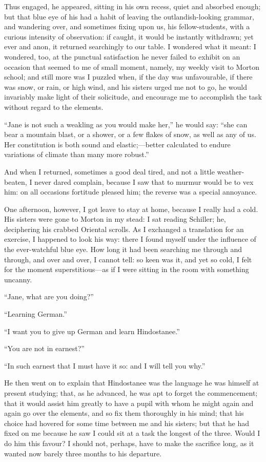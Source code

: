 Thus engaged, he appeared, sitting in his own recess, quiet and absorbed
enough; but that blue eye of his had a habit of leaving the
outlandish-looking grammar, and wandering over, and sometimes fixing
upon us, his fellow-students, with a curious intensity of observation:
if caught, it would be instantly withdrawn; yet ever and anon, it
returned searchingly to our table. I wondered what it meant: I
wondered, too, at the punctual satisfaction he never failed to exhibit
on an occasion that seemed to me of small moment, namely, my weekly
visit to Morton school; and still more was I puzzled when, if the day
was unfavourable, if there was snow, or rain, or high wind, and his
sisters urged me not to go, he would invariably make light of their
solicitude, and encourage me to accomplish the task without regard to
the elements.

\enquote{Jane is not such a weakling as you would make her,} he would
say: \enquote{she can bear a mountain blast, or a shower, or a few
	flakes of snow, as well as any of us. Her constitution is both sound
	and elastic;---better calculated to endure variations of climate than
	many more robust.}

And when I returned, sometimes a good deal tired, and not a little
weather-beaten, I never dared complain, because I saw that to murmur
would be to vex him: on all occasions fortitude pleased him; the reverse
was a special annoyance.

One afternoon, however, I got leave to stay at home, because I really
had a cold. His sisters were gone to Morton in my stead: I sat reading
Schiller; he, deciphering his crabbed Oriental scrolls. As I exchanged
a translation for an exercise, I happened to look his way: there I found
myself under the influence of the ever-watchful blue eye. How long it
had been searching me through and through, and over and over, I cannot
tell: so keen was it, and yet so cold, I felt for the moment
superstitious---as if I were sitting in the room with something uncanny.

\enquote{Jane, what are you doing?}

\enquote{Learning German.}

\enquote{I want you to give up German and learn Hindostanee.}

\enquote{You are not in earnest?}

\enquote{In such earnest that I must have it so: and I will tell you
	why.}

He then went on to explain that Hindostanee was the language he was
himself at present studying; that, as he advanced, he was apt to forget
the commencement; that it would assist him greatly to have a pupil with
whom he might again and again go over the elements, and so fix them
thoroughly in his mind; that his choice had hovered for some time
between me and his sisters; but that he had fixed on me because he saw I
could sit at a task the longest of the three. Would I do him this
favour? I should not, perhaps, have to make the sacrifice long, as it
wanted now barely three months to his departure.

